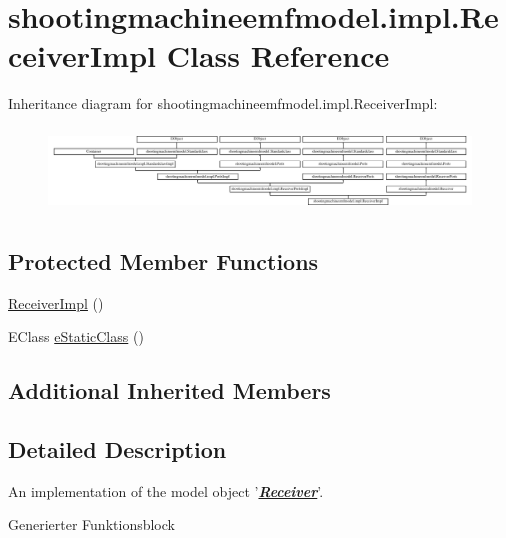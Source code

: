 \hypertarget{classshootingmachineemfmodel_1_1impl_1_1_receiver_impl}{\section{shootingmachineemfmodel.\-impl.\-Receiver\-Impl Class Reference}
\label{classshootingmachineemfmodel_1_1impl_1_1_receiver_impl}
}
Inheritance diagram for shootingmachineemfmodel.\-impl.\-Receiver\-Impl\-:\begin{figure}[H]
\begin{center}
\leavevmode
\includegraphics[height=2.247492cm]{classshootingmachineemfmodel_1_1impl_1_1_receiver_impl}
\end{center}
\end{figure}
\subsection*{Protected Member Functions}
\begin{DoxyCompactItemize}
\item 
\hyperlink{classshootingmachineemfmodel_1_1impl_1_1_receiver_impl_aff5c25015b2c6a49a52752e9c2b8b073}{Receiver\-Impl} ()
\item 
E\-Class \hyperlink{classshootingmachineemfmodel_1_1impl_1_1_receiver_impl_a141a9da98315fbb6c8517dc359fa544d}{e\-Static\-Class} ()
\end{DoxyCompactItemize}
\subsection*{Additional Inherited Members}


\subsection{Detailed Description}
An implementation of the model object '{\itshape {\bfseries \hyperlink{interfaceshootingmachineemfmodel_1_1_receiver}{Receiver}}}'.

Generierter Funktionsblock 

